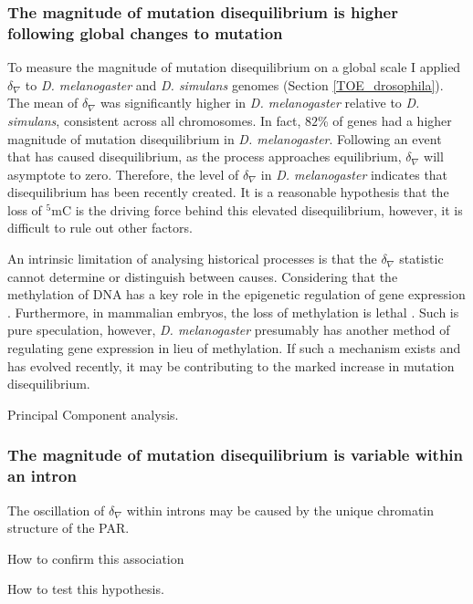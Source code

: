 \subsubsection{The magnitude of mutation disequilibrium is higher following global changes to mutation}

To measure the magnitude of mutation disequilibrium on a global scale I applied $\delta_\nabla$ to \textit{D. melanogaster} and \textit{D. simulans} genomes (Section \ref{TOE_drosophila}). The mean of $\delta_\nabla$ was significantly higher in \textit{D. melanogaster} relative to \textit{D. simulans}, consistent across all chromosomes. In fact, $82$\% of genes had a higher magnitude of mutation disequilibrium in \textit{D. melanogaster}. Following an event that has caused disequilibrium, as the process approaches equilibrium, $\delta_\nabla$ will asymptote to zero. Therefore, the level of $\delta_\nabla$ in \textit{D. melanogaster} indicates that disequilibrium has been recently created. It is a reasonable hypothesis that the loss of $^5$mC is the driving force behind this elevated disequilibrium, however, it is difficult to rule out other factors. 

An intrinsic limitation of analysing historical processes is that the $\delta_\nabla$ statistic cannot determine or distinguish between causes. Considering that the methylation of DNA has a key role in the epigenetic regulation of gene expression \citep{Holliday1975DNADevelopment, Compere1981DNACells, Lieberman1983UltravioletDemethylation}. Furthermore, in mammalian embryos, the loss of methylation is lethal \citep{Panning1996DNAGenes}. Such is pure speculation, however, \textit{D. melanogaster} presumably has another method of regulating gene expression in lieu of methylation. If such a mechanism exists and has evolved recently, it may be contributing to the marked increase in mutation disequilibrium. 

Principal Component analysis. 

\subsubsection{The magnitude of mutation disequilibrium is variable within an intron}

The oscillation of $\delta_\nabla$ within introns may be caused by the unique chromatin structure of the PAR. 

How to confirm this association

How to test this hypothesis. 




